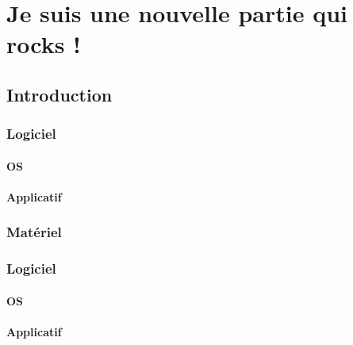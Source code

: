 



\maketitle
\tableofcontents 

\part{Je suis une nouvelle partie qui rocks !}
\chapter{Introduction}
\section{Logiciel}
\subsection{OS}
\subsection{Applicatif}
\section{Matériel}
\section{Logiciel}
\subsection{OS}
\subsection{Applicatif}
